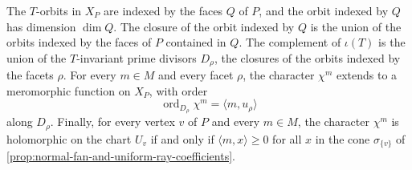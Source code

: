 \begin{proposition}\label{prop:toric-orbits-and-prime-divisors}
The $T$-orbits in $X_P$ are indexed by the faces $Q$ of $P$, and the orbit indexed by $Q$ has dimension $\dim Q$. The closure of the orbit indexed by $Q$ is the union of the orbits indexed by the faces of $P$ contained in $Q$. The complement of $\iota(T)$ is the union of the $T$-invariant prime divisors $D_\rho$, the closures of the orbits indexed by the facets $\rho$. For every $m\in M$ and every facet $\rho$, the character $\chi^m$ extends to a meromorphic function on $X_P$, with order
\[
 \operatorname{ord}_{D_\rho}\chi^m=\langle m,u_\rho\rangle
\]
along $D_\rho$. Finally, for every vertex $v$ of $P$ and every $m\in M$, the character $\chi^m$ is holomorphic on the chart $U_v$ if and only if $\langle m,x\rangle\geq0$ for all $x$ in the cone $\sigma_{\{v\}}$ of \cref{prop:normal-fan-and-uniform-ray-coefficients}.
\end{proposition}
